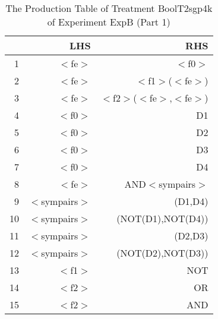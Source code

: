 \begin{table}[ht]
\centering
\begin{tabular}{rrr}
  \hline
 & LHS & RHS \\ 
  \hline
1 & $<$fe$>$ & $<$f0$>$ \\ 
  2 & $<$fe$>$ & $<$f1$>$($<$fe$>$) \\ 
  3 & $<$fe$>$ & $<$f2$>$($<$fe$>$,$<$fe$>$) \\ 
  4 & $<$f0$>$ & D1 \\ 
  5 & $<$f0$>$ & D2 \\ 
  6 & $<$f0$>$ & D3 \\ 
  7 & $<$f0$>$ & D4 \\ 
  8 & $<$fe$>$ & AND$<$sympairs$>$ \\ 
  9 & $<$sympairs$>$ & (D1,D4) \\ 
  10 & $<$sympairs$>$ & (NOT(D1),NOT(D4)) \\ 
  11 & $<$sympairs$>$ & (D2,D3) \\ 
  12 & $<$sympairs$>$ & (NOT(D2),NOT(D3)) \\ 
  13 & $<$f1$>$ & NOT \\ 
  14 & $<$f2$>$ & OR \\ 
  15 & $<$f2$>$ & AND \\ 
   \hline
\end{tabular}
\caption{The Production Table of Treatment BoolT2sgp4k of Experiment ExpB (Part 1)} 
\end{table}
